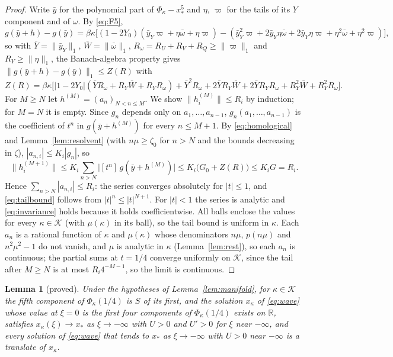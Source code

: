 \documentclass[11pt]{article}
\newtheorem{lemma}{Lemma}[section]
\theoremstyle{definition}
\newcommand{\R}{\mathbb{R}}
\newcommand{\Kset}{\mathcal{K}}
\newcommand{\xs}{x_*}
\begin{document}
\begin{proof}
Write $\bar y$ for the polynomial part of $\Phi_\kappa - \xs^5$ and $\eta$, $\varpi$ for the tails of its $Y$ component and of $\omega$. By \eqref{eq:F5},
\[
  g(\bar y + h) - g(\bar y) = \beta\kappa\bigl[(1 - 2Y_0)(\bar y_Y\varpi + \eta\bar\omega + \eta\varpi) - (\bar y_Y^2\varpi + 2\bar y_Y\eta\bar\omega + 2\bar y_Y\eta\varpi + \eta^2\bar\omega + \eta^2\varpi)\bigr],
\]
so with $\bar Y = \|\bar y_Y\|_1$, $\bar W = \|\bar\omega\|_1$, $R_\omega = R_U + R_V + R_Q \ge \|\varpi\|_1$ and $R_Y \ge \|\eta\|_1$, the Banach-algebra property gives $\|g(\bar y + h) - g(\bar y)\|_1 \le Z(R)$ with
\[
  Z(R) = \beta\kappa\bigl[|1 - 2Y_0|(\bar Y R_\omega + R_Y\bar W + R_Y R_\omega) + \bar Y^2 R_\omega + 2\bar Y R_Y\bar W + 2\bar Y R_Y R_\omega + R_Y^2\bar W + R_Y^2 R_\omega\bigr].
\]
For $M \ge N$ let $h^{(M)} = (a_n)_{N < n \le M}$. We show $\|h^{(M)}_i\| \le R_i$ by induction; for $M = N$ it is empty. Since $g_n$ depends only on $a_1, \dots, a_{n-1}$, $g_n(a_1, \dots, a_{n-1})$ is the coefficient of $t^n$ in $g(\bar y + h^{(M)})$ for every $n \le M + 1$. By \eqref{eq:homological} and Lemma~\ref{lem:resolvent} (with $n\mu \ge \zeta_0$ for $n > N$ and the bounds decreasing in $\zeta$), $|a_{n, i}| \le K_i|g_n|$, so
\[
  \|h^{(M+1)}_i\| \le K_i \sum_{n > N}\bigl|[t^n]\, g(\bar y + h^{(M)})\bigr| \le K_i\bigl(G_0 + Z(R)\bigr) \le K_iG = R_i .
\]
Hence $\sum_{n > N}|a_{n, i}| \le R_i$: the series converges absolutely for $|t| \le 1$, and \eqref{eq:tailbound} follows from $|t|^n \le |t|^{N+1}$. For $|t| < 1$ the series is analytic and \eqref{eq:invariance} holds because it holds coefficientwise. All balls enclose the values for every $\kappa \in \Kset$ (with $\mu(\kappa)$ in its ball), so the tail bound is uniform in $\kappa$. Each $a_n$ is a rational function of $\kappa$ and $\mu(\kappa)$ whose denominators $n\mu$, $p(n\mu)$ and $n^2\mu^2 - 1$ do not vanish, and $\mu$ is analytic in $\kappa$ (Lemma~\ref{lem:rest}), so each $a_n$ is continuous; the partial sums at $t = 1/4$ converge uniformly on $\Kset$, since the tail after $M \ge N$ is at most $R_i 4^{-M-1}$, so the limit is continuous.
\end{proof}

\begin{lemma}[proved]\label{lem:branch}
Under the hypotheses of Lemma~\ref{lem:manifold}, for $\kappa \in \Kset$ the fifth component of $\Phi_\kappa(1/4)$ is $S$ of its first, and the solution $x_\kappa$ of \eqref{eq:wave} whose value at $\xi = 0$ is the first four components of $\Phi_\kappa(1/4)$ exists on $\R$, satisfies $x_\kappa(\xi) \to \xs$ as $\xi \to -\infty$ with $U > 0$ and $U' > 0$ for $\xi$ near $-\infty$, and every solution of \eqref{eq:wave} that tends to $\xs$ as $\xi \to -\infty$ with $U > 0$ near $-\infty$ is a translate of $x_\kappa$.
\end{lemma}
\end{document}
